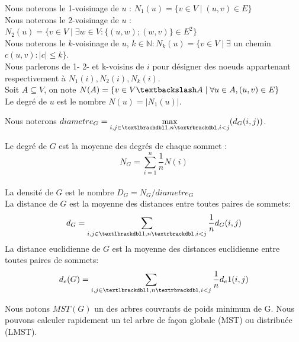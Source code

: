 \begin{mydef}
Nous noterons le 1-voisinage de $u$ : $N_1(u) = \{ v \in V  \mid (u,v) \in E \}$ \\
Nous noterons le 2-voisinage de $u$ : $N_2(u) = \{ v \in V \mid  \exists w \in V :\{(u,w);(w,v)\} \in E ^2\}$ \\
Nous noterons le $k$-voisinage de $u$, $k \in \mathbb{N} : N_k(u) = \{ v \in V  \mid \exists $ un chemin $c (u,v): |c| \leq k\}$.\\
Nous parlerons de 1- 2- et k-voisins de $i$ pour désigner des noeuds appartenant respectivement
 à $N_1(i), N_2(i),N_k(i)$. \\
Soit $A \subseteq V$, on note $N(A) = \{ v \in V\textbackslash  A \mid \forall u\in A,(u,v) \in E \}$ \\
Le degré de $ u $ est le nombre  $N(u)=|N_1(u)|$.\\
\end{mydef}

\begin{mydef}
Nous noterons $diametre_G= \max\limits_{i,j\in \textlbrackdbl 1,n \textrbrackdbl,i<j} (d_G(i,j))$.
\end{mydef}
 









\begin{mydef}
 
 Le degré de $G$ est la moyenne des degrés de chaque sommet : $$N_G=\sum_{i=1}^n{\frac1n N(i)}$$\\
 La densité de $G$ est le nombre $D_G=N_G/diametre_G$\\
 La distance de $G$ est la moyenne des distances entre toutes paires de sommets:$$d_G=\sum_{i,j\in \textlbrackdbl 1,n \textrbrackdbl,i<j}{\frac1n d_G(i,j)}$$
 La distance euclidienne de $G$ est la moyenne des distances euclidienne entre toutes paires de sommets:$$d_e(G)=\sum_{i,j\in \textlbrackdbl 1,n \textrbrackdbl,i<j}{\frac1n d_e1(i,j)}$$

\end{mydef}

\begin{mydef}
 Nous notons $MST(G)$ un des arbres couvrants de poids minimum de G. Nous pouvons calculer rapidement un tel arbre de façon globale (MST) ou distribuée (LMST).


\end{mydef}

